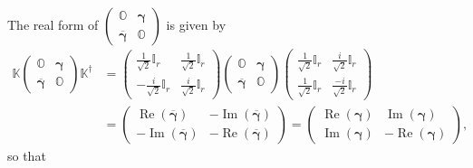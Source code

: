 \documentclass[aps, preprint]{revtex4}
\begin{document}
The real form of $\left (\begin{array}{cc}\mathbb{O} & \mathbf{\gamma } \\
\overline{\mathbf{\gamma }} & \mathbb{O}\end{array}\right )$ is given by
\begin{align}\mathbb{K} \left (\begin{array}{cc}\mathbb{O} & \mathbf{\gamma } \\
\overline{\mathbf{\gamma }} & \mathbb{O}\end{array}\right ) \mathbb{K}^{ \dag } &  =\left (\begin{array}{cc}\frac{1}{\sqrt{2}} \mathbb{I}_{r} & \frac{1}{\sqrt{2}} \mathbb{I}_{r} \\
 -\frac{i}{\sqrt{2}} \mathbb{I}_{r} & \frac{i}{\sqrt{2}} \mathbb{I}_{r}\end{array}\right ) \left (\begin{array}{cc}\mathbb{O} & \mathbf{\gamma } \\
\overline{\mathbf{\gamma }} & \mathbb{O}\end{array}\right ) \left (\begin{array}{cc}\frac{1}{\sqrt{2}} \mathbb{I}_{r} & \frac{i}{\sqrt{2}} \mathbb{I}_{r} \\
\frac{1}{\sqrt{2}} \mathbb{I}_{r} & \frac{ -i}{\sqrt{2}} \mathbb{I}_{r}\end{array}\right ) \\
 &  =\left (\begin{array}{cc}\ensuremath{\operatorname*{Re}} \left (\overline{\mathbf{\gamma }}\right ) &  -\ensuremath{\operatorname*{Im}} \left (\overline{\mathbf{\gamma }}\right ) \\
 -\ensuremath{\operatorname*{Im}} \left (\overline{\mathbf{\gamma }}\right ) &  -\ensuremath{\operatorname*{Re}} \left (\overline{\mathbf{\gamma }}\right )\end{array}\right ) =\left (\begin{array}{cc}\ensuremath{\operatorname*{Re}} \left (\mathbf{\gamma }\right ) & \ensuremath{\operatorname*{Im}} \left (\mathbf{\gamma }\right ) \\
\ensuremath{\operatorname*{Im}} \left (\mathbf{\gamma }\right ) &  -\ensuremath{\operatorname*{Re}} \left (\mathbf{\gamma }\right )\end{array}\right )\text{,}\end{align}so that
\end{document}
